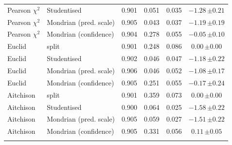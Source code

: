 \begin{tabular}{llcccc}
Pearson $\chi^2$ & Studentised & 0.901 & 0.051 & 0.035 & $-1.28\,{\scriptstyle\pm0.21}$\\
Pearson $\chi^2$ & Mondrian (pred. scale) & 0.905 & 0.043 & 0.037 & $-1.19\,{\scriptstyle\pm0.19}$\\
Pearson $\chi^2$ & Mondrian (confidence) & 0.904 & 0.278 & 0.055 & $-0.05\,{\scriptstyle\pm0.10}$\\
Euclid & split & 0.901 & 0.248 & 0.086 & $0.00\,{\scriptstyle\pm0.00}$\\
Euclid & Studentised & 0.902 & 0.046 & 0.047 & $-1.18\,{\scriptstyle\pm0.22}$\\
Euclid & Mondrian (pred. scale) & 0.906 & 0.046 & 0.052 & $-1.08\,{\scriptstyle\pm0.17}$\\
Euclid & Mondrian (confidence) & 0.905 & 0.251 & 0.055 & $-0.17\,{\scriptstyle\pm0.24}$\\
Aitchison & split & 0.901 & 0.359 & 0.073 & $0.00\,{\scriptstyle\pm0.00}$\\
Aitchison & Studentised & 0.900 & 0.064 & 0.025 & $-1.58\,{\scriptstyle\pm0.22}$\\
Aitchison & Mondrian (pred. scale) & 0.905 & 0.059 & 0.027 & $-1.51\,{\scriptstyle\pm0.22}$\\
Aitchison & Mondrian (confidence) & 0.905 & 0.331 & 0.056 & $0.11\,{\scriptstyle\pm0.05}$\\
\addlinespace[2pt]
\bottomrule\end{tabular}
